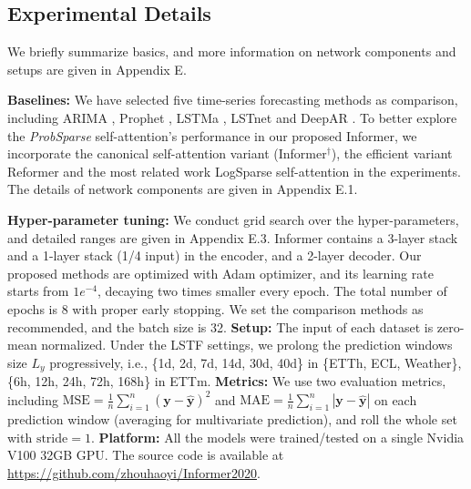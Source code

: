 \documentclass[letterpaper]{article} %
\newcommand{\mb}{\mathbf}
\newcommand{\mn}{Informer}
\begin{document}
\subsection{Experimental Details}
We briefly summarize basics, and more information on network components and setups are given in Appendix E.

\textbf{Baselines:}
We have selected five time-series forecasting methods as comparison, including ARIMA \cite{ariyo2014stock}, Prophet \cite{taylor2018forecasting}, LSTMa \cite{bahdanau2014neural}, LSTnet \cite{lai2018modeling} and DeepAR \cite{flunkert2017deepar}. To better explore the \emph{ProbSparse} self-attention's performance in our proposed {\mn}, we incorporate the canonical self-attention variant (\mn$^{\dag}$), the efficient variant Reformer \cite{kitaev2019reformer} and the most related work LogSparse self-attention \cite{li2019enhancing} in the experiments.
The details of network components are given in Appendix E.1. 

\textbf{Hyper-parameter tuning:}
We conduct grid search over the hyper-parameters, and detailed ranges are given in Appendix E.3. {\mn} contains a 3-layer stack and a 1-layer stack (1/4 input) in the encoder, and a 2-layer decoder. Our proposed methods are optimized with Adam optimizer, and its learning rate starts from $1e^{-4}$, decaying two times smaller every epoch. The total number of epochs is 8 with proper early stopping. We set the comparison methods as recommended, and the batch size is 32.
\textbf{Setup:}
The input of each dataset is zero-mean normalized.
Under the LSTF settings, we prolong the prediction windows size $L_y$ progressively, i.e., \{1d, 2d, 7d, 14d, 30d, 40d\} in \{ETTh, ECL, Weather\}, \{6h, 12h, 24h, 72h, 168h\} in ETTm.
\textbf{Metrics:} We use two evaluation metrics, including $\textrm{MSE}=\frac{1}{n}\sum_{i=1}^{n}(\mb{y}-\hat{\mb{y}})^2$ and $\textrm{MAE}=\frac{1}{n}\sum_{i=1}^{n}|\mb{y}-\hat{\mb{y}}|$ on each prediction window (averaging for multivariate prediction), and roll the whole set with $\textrm{stride}=1$.
\textbf{Platform:} All the models were trained/tested on a single Nvidia V100 32GB GPU. The source code is available at \url{https://github.com/zhouhaoyi/Informer2020}.
\end{document}
